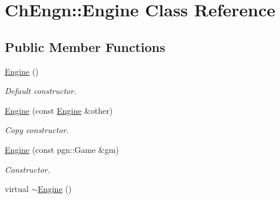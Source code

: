 \hypertarget{classChEngn_1_1Engine}{
\section{ChEngn::Engine Class Reference}
\label{classChEngn_1_1Engine}
}
\subsection*{Public Member Functions}
\begin{DoxyCompactItemize}
\item 
\hypertarget{classChEngn_1_1Engine_a2bd4b075e86d94d94f3ea97c680b302e}{
\hyperlink{classChEngn_1_1Engine_a2bd4b075e86d94d94f3ea97c680b302e}{Engine} ()}
\label{classChEngn_1_1Engine_a2bd4b075e86d94d94f3ea97c680b302e}

\begin{DoxyCompactList}\small\item\em Default constructor. \item\end{DoxyCompactList}\item 
\hyperlink{classChEngn_1_1Engine_ab92c015fc819dc2b7c51cccbc7878002}{Engine} (const \hyperlink{classChEngn_1_1Engine}{Engine} \&other)
\begin{DoxyCompactList}\small\item\em Copy constructor. \item\end{DoxyCompactList}\item 
\hyperlink{classChEngn_1_1Engine_a1184e133eae1f7e23bf405302fa9f53c}{Engine} (const pgn::Game \&gm)
\begin{DoxyCompactList}\small\item\em Constructor. \item\end{DoxyCompactList}\item 
\hypertarget{classChEngn_1_1Engine_a83fcd852ca53c24a7af0e3dd689fe0f7}{
virtual \hyperlink{classChEngn_1_1Engine_a83fcd852ca53c24a7af0e3dd689fe0f7}{$\sim$Engine} ()}
\label{classChEngn_1_1Engine_a83fcd852ca53c24a7af0e3dd689fe0f7}


\end{DoxyCompactItemize}
